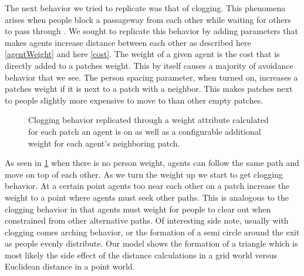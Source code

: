 \documentclass[12pt,letterpaper]{article}
\begin{document}
The next behavior we tried to replicate was that of clogging.  This phenomena arises when people block a passageway from each other while waiting for others to pass through \cite{almeidaCrowdSimulationModeling2013}.  We sought to replicate this behavior by adding parameters that makes agents increase distance between each other as described here \ref{agentWeight} and here \ref{cost}.  The weight of a given agent is the cost that is directly added to a patches weight.  This by itself causes a majority of avoidance behavior that we see. The person spacing parameter, when turned on, increases a patches weight if it is next to a patch with a neighbor.  This makes patches next to people slightly more expensive to move to than other empty patches.  


\begin{figure}[H]
  \centering
  \hfill
  \caption{Clogging behavior replicated through a weight attribute calculated for each patch an agent is on as well as a configurable additional weight for each agent's neighboring patch. }
  \label{clogging}
\end{figure}

As seen in \ref{clogging} when there is no person weight, agents can follow the same path and move on top of each other.  As we turn the weight up we start to get clogging behavior.  At a certain point agents too near each other on a patch increase the weight to a point where agents must seek other paths.  This is analogous to the clogging behavior in that agents must weight for people to clear out when constrained from other alternative paths.  Of interesting side note, usually with clogging comes arching behavior, or the formation of a semi circle around the exit as people evenly distribute.  Our model shows the formation of a triangle which is most likely the side effect of the distance calculations in a grid world versus Euclidean distance in a point world. 
\end{document}
